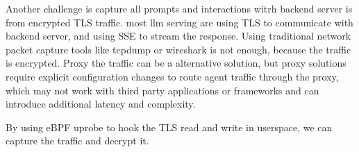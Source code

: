 \documentclass[sigplan,screen，review,9pt]{acmart}
\begin{document}
Another challenge is capture all prompts and interactions witrh backend server is from encrypted TLS traffic. most llm serving are using TLS to communicate with backend server, and using SSE to stream the response. Using traditional network packet capture tools like tcpdump or wireshark is not enough, because the traffic is encrypted. Proxy the traffic can be a alternative solution, but proxy solutions require explicit configuration changes to route agent traffic through the proxy, which may not work with third party applications or frameworks and can introduce additional latency and complexity.

By using eBPF uprobe to hook the TLS read and write in userspace, we can capture the traffic and decrypt it.



\end{document}
